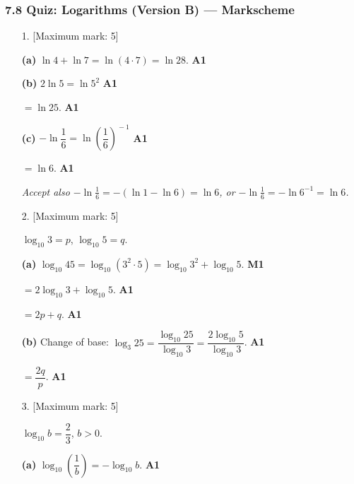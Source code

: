 \documentclass[12pt, twoside]{article}
\begin{document}
\subsubsection*{7.8 Quiz: Logarithms (Version B) --- Markscheme}

\begin{enumerate}[itemsep=0.3cm]

\item[1.] [Maximum mark: 5]

\textbf{(a)} $\ln 4 + \ln 7 = \ln(4 \cdot 7) = \ln 28$. \hfill \textbf{A1}

\medskip

\textbf{(b)} $2\ln 5 = \ln 5^{2}$ \hfill \textbf{A1}

$= \ln 25$. \hfill \textbf{A1}

\medskip

\textbf{(c)} $-\ln\dfrac{1}{6} = \ln\!\left(\dfrac{1}{6}\right)^{\!-1}$
\hfill \textbf{A1}

$= \ln 6$. \hfill \textbf{A1}

\emph{Accept also $-\ln\tfrac{1}{6} = -(\ln 1 - \ln 6) = \ln 6$, or
$-\ln\tfrac{1}{6} = -\ln 6^{-1} = \ln 6$.}

\medskip

\item[2.] [Maximum mark: 5]

$\log_{10} 3 = p$, $\log_{10} 5 = q$.

\medskip

\textbf{(a)} $\log_{10} 45 = \log_{10}(3^{2} \cdot 5)
= \log_{10} 3^{2} + \log_{10} 5$. \hfill \textbf{M1}

$= 2\log_{10} 3 + \log_{10} 5$. \hfill \textbf{A1}

$= 2p + q$. \hfill \textbf{A1}

\medskip

\textbf{(b)} Change of base:
$\log_{3} 25 = \dfrac{\log_{10} 25}{\log_{10} 3}
= \dfrac{2\log_{10} 5}{\log_{10} 3}$. \hfill \textbf{A1}

$= \dfrac{2q}{p}$. \hfill \textbf{A1}

\newpage

\item[3.] [Maximum mark: 5]

$\log_{10} b = \dfrac{2}{3}$, $b > 0$.

\medskip

\textbf{(a)} $\log_{10}\!\left(\dfrac{1}{b}\right) = -\log_{10} b$.
\hfill \textbf{A1}


\end{enumerate}
\end{document}
